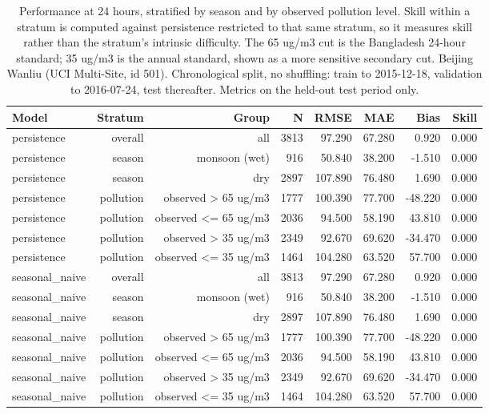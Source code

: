 \begin{table}[htbp]
\caption{Performance at 24 hours, stratified by season and by observed pollution level. Skill within a stratum is computed against persistence restricted to that same stratum, so it measures skill rather than the stratum's intrinsic difficulty. The 65 ug/m3 cut is the Bangladesh 24-hour standard; 35 ug/m3 is the annual standard, shown as a more sensitive secondary cut. Beijing Wanliu (UCI Multi-Site, id 501). Chronological split, no shuffling: train to 2015-12-18, validation to 2016-07-24, test thereafter. Metrics on the held-out test period only.}
\label{tab:stratified_metrics}
\begin{tabular}{lrrrrrrr}
\toprule
Model & Stratum & Group & N & RMSE & MAE & Bias & Skill \\
\midrule
persistence & overall & all & 3813 & 97.290 & 67.280 & 0.920 & 0.000 \\
persistence & season & monsoon (wet) & 916 & 50.840 & 38.200 & -1.510 & 0.000 \\
persistence & season & dry & 2897 & 107.890 & 76.480 & 1.690 & 0.000 \\
persistence & pollution & observed > 65 ug/m3 & 1777 & 100.390 & 77.700 & -48.220 & 0.000 \\
persistence & pollution & observed <= 65 ug/m3 & 2036 & 94.500 & 58.190 & 43.810 & 0.000 \\
persistence & pollution & observed > 35 ug/m3 & 2349 & 92.670 & 69.620 & -34.470 & 0.000 \\
persistence & pollution & observed <= 35 ug/m3 & 1464 & 104.280 & 63.520 & 57.700 & 0.000 \\
seasonal\_naive & overall & all & 3813 & 97.290 & 67.280 & 0.920 & 0.000 \\
seasonal\_naive & season & monsoon (wet) & 916 & 50.840 & 38.200 & -1.510 & 0.000 \\
seasonal\_naive & season & dry & 2897 & 107.890 & 76.480 & 1.690 & 0.000 \\
seasonal\_naive & pollution & observed > 65 ug/m3 & 1777 & 100.390 & 77.700 & -48.220 & 0.000 \\
seasonal\_naive & pollution & observed <= 65 ug/m3 & 2036 & 94.500 & 58.190 & 43.810 & 0.000 \\
seasonal\_naive & pollution & observed > 35 ug/m3 & 2349 & 92.670 & 69.620 & -34.470 & 0.000 \\
seasonal\_naive & pollution & observed <= 35 ug/m3 & 1464 & 104.280 & 63.520 & 57.700 & 0.000 \\

\end{tabular}
\end{table}
